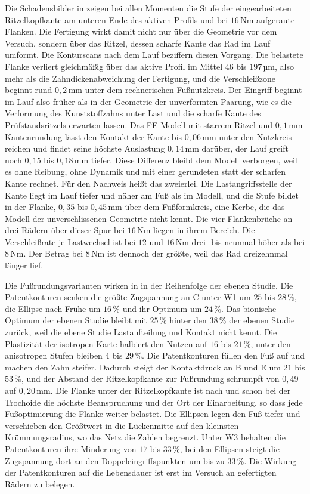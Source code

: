 Die Schadensbilder in  zeigen bei allen Momenten die Stufe der eingearbeiteten Ritzelkopfkante am unteren Ende des aktiven Profils und bei $16$\,Nm aufgeraute Flanken. Die Fertigung wirkt damit nicht nur über die Geometrie vor dem Versuch, sondern über das Ritzel, dessen scharfe Kante das Rad im Lauf umformt. Die Konturscans nach dem Lauf beziffern diesen Vorgang. Die belastete Flanke verliert gleichmäßig über das aktive Profil im Mittel $46$ bis $197$\,µm, also mehr als die Zahndickenabweichung der Fertigung, und die Verschleißzone beginnt rund $0{,}2$\,mm unter dem rechnerischen Fußnutzkreis. Der Eingriff beginnt im Lauf also früher als in der Geometrie der unverformten Paarung, wie es die Verformung des Kunststoffzahns unter Last und die scharfe Kante des Prüfstandsritzels erwarten lassen. Das FE-Modell mit starrem Ritzel und $0{,}1$\,mm Kantenrundung lässt den Kontakt der Kante bis $0{,}06$\,mm unter den Nutzkreis reichen und findet seine höchste Auslastung $0{,}14$\,mm darüber, der Lauf greift noch $0{,}15$ bis $0{,}18$\,mm tiefer. Diese Differenz bleibt dem Modell verborgen, weil es ohne Reibung, ohne Dynamik und mit einer gerundeten statt der scharfen Kante rechnet. Für den Nachweis heißt das zweierlei. Die Lastangriffsstelle der Kante liegt im Lauf tiefer und näher am Fuß als im Modell, und die Stufe bildet in der Flanke, $0{,}35$ bis $0{,}45$\,mm über dem Fußformkreis, eine Kerbe, die das Modell der unverschlissenen Geometrie nicht kennt. Die vier Flankenbrüche an drei Rädern über dieser Spur bei $16$\,Nm liegen in ihrem Bereich. Die Verschleißrate je Lastwechsel ist bei $12$ und $16$\,Nm drei- bis neunmal höher als bei $8$\,Nm. Der Betrag bei $8$\,Nm ist dennoch der größte, weil das Rad dreizehnmal länger lief.

Die Fußrundungsvarianten wirken in  in der Reihenfolge der ebenen Studie. Die Patentkonturen senken die größte Zugspannung an C unter W1 um $25$ bis $28$\,\%, die Ellipse nach Frühe um $16$\,\% und ihr Optimum um $24$\,\%. Das bionische Optimum der ebenen Studie bleibt mit $25$\,\% hinter den $38$\,\% der ebenen Studie zurück, weil die ebene Studie Lastaufteilung und Kontakt nicht kennt. Die Plastizität der isotropen Karte halbiert den Nutzen auf $16$ bis $21$\,\%, unter den anisotropen Stufen bleiben $4$ bis $29$\,\%. Die Patentkonturen füllen den Fuß auf und machen den Zahn steifer. Dadurch steigt der Kontaktdruck an B und E um $21$ bis $53$\,\%, und der Abstand der Ritzelkopfkante zur Fußrundung schrumpft von $0{,}49$ auf $0{,}20$\,mm. Die Flanke unter der Ritzelkopfkante ist nach  und  schon bei der Trochoide die höchste Beanspruchung und der Ort der Einarbeitung, so dass jede Fußoptimierung die Flanke weiter belastet. Die Ellipsen legen den Fuß tiefer und verschieben den Größtwert in die Lückenmitte auf den kleinsten Krümmungsradius, wo das Netz die Zahlen begrenzt. Unter W3 behalten die Patentkonturen ihre Minderung von $17$ bis $33$\,\%, bei den Ellipsen steigt die Zugspannung dort an den Doppeleingriffspunkten um bis zu $33$\,\%. Die Wirkung der Patentkonturen auf die Lebensdauer ist erst im Versuch an gefertigten Rädern zu belegen.

